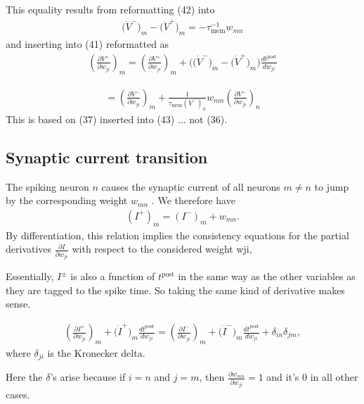 \documentclass[a4paper]{article}
\newcommand{\blue}[1]{{\color{blue}#1}}
\begin{document}
This equality results from reformatting \blue{(42)} into
\begin{align}
  \big(\dot{V}^-\big)_m - \big(\dot{V}^+\big)_m =
  - \tau_{\text{mem}}^{-1} w_{mn}
\end{align}
and inserting into \blue{(41)} reformatted as
\begin{align}
  \left(\frac{\partial V^+}{\partial w_{ji}}\right)_m =
  \left(\frac{\partial V^+}{\partial w_{ji}}\right)_m +  \Big(\big(
    \dot{V}^-\big)_m - \big(\dot{V}^+\big)_m \Big) \frac{d
      t^{\text{post}}}{d w_{ji}}
\end{align}

\blue{
  \begin{align}
    = \left(\frac{\partial V^-}{\partial w_{ji}}\right)_m +
  \frac{1}{\tau_{\text{mem}} (\dot{V}^-)_n} w_{nm}
  \left(\frac{\partial V^-}{\partial w_{ji}} \right)_n \tag{44}
  \end{align}
}
This is based on \blue{(37)} inserted into \blue{(43)} ... not
\blue{(36)}.

\blue{
  \subsection{Synaptic current transition}
  The spiking neuron $n$ causes the synaptic current of all neurons $m
  \neq n$ to jump by the corresponding weight $w_{mn}$ . We therefore have
  \begin{align}
    (I^+)_m = (I^-)_m + w_{mn} . \tag{45}
  \end{align}
  By differentiation, this relation implies the consistency equations
  for the partial derivatives $\frac{\partial I}{\partial w_{ji}}$
  with respect to the considered weight wji,
}

Essentially, $I^{\pm}$ is also a function of $t^{\text{post}}$ in the
same way as the other variables as they are tagged to the spike
time. So taking the same kind of derivative makes sense.

\blue{
  \begin{align}
    \left(\frac{\partial I^+}{\partial w_{ji}}\right)_m +
    \big(\dot{I}^+\big)_m \frac{d t^{\text{post}}}{d w_{ji}} =
    \left(\frac{\partial I^-}{\partial w_{ji}}\right)_m  +
    \big(\dot{I}^-\big)_m \frac{d t^{\text{post}}}{d w_{ji}} +
    \delta_{in}\delta_{jm}, \tag{46}
  \end{align}
  where $\delta_{ji}$ is the Kronecker delta.
}

Here the $\delta$'s arise because if $i=n$ and $j=m$, then
$\frac{\partial w_{mn}}{\partial w_{ji}} = 1 $ and it's $0$ in all
other cases.
\end{document}

